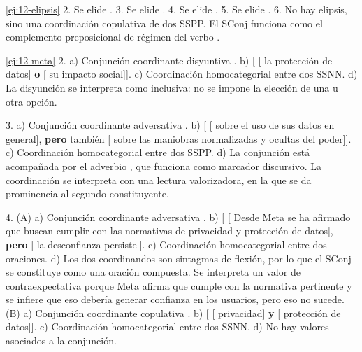 \begin{solucion}{\ref{ej:12-elipsis}}
2. Se elide . 3. Se elide . 4.
Se elide . 5. Se elide . 6. No hay elipsis, sino una coordinación copulativa de dos SSPP. El
SConj funciona como el complemento preposicional de régimen del verbo
.
\end{solucion}

\begin{solucion}{\ref{ej:12-meta}}
2. a) Conjunción coordinante disyuntiva . b) [
[ la protección de datos] \textbf{o} [ su
impacto social]]. c) Coordinación homocategorial entre dos SSNN. d) La
disyunción se interpreta como inclusiva: no se impone la elección de una u otra
opción.

3. a) Conjunción coordinante adversativa . b) [
[ sobre el uso de sus datos en general], \textbf{pero}
también [ sobre las maniobras normalizadas y ocultas del poder]].
c) Coordinación homocategorial entre dos SSPP. d) La conjunción está acompañada
por el adverbio , que funciona como marcador discursivo. La
coordinación se interpreta con una lectura valorizadora, en la que se da
prominencia al segundo constituyente.

4. (A) a) Conjunción coordinante adversativa . b) [
[ Desde Meta se ha afirmado que buscan cumplir con las normativas de
privacidad y protección de datos], \textbf{pero} [ la
desconfianza persiste]]. c) Coordinación homocategorial entre dos oraciones. d)
Los dos coordinandos son sintagmas de flexión, por lo que el SConj se constituye
como una oración compuesta. Se interpreta un valor de contraexpectativa porque
Meta afirma que cumple con la normativa pertinente y se infiere que eso debería
generar confianza en los usuarios, pero eso no sucede. (B) a) Conjunción
coordinante copulativa . b) [ [ privacidad]
\textbf{y} [ protección de datos]]. c) Coordinación
homocategorial entre dos SSNN. d) No hay valores asociados a la conjunción.


\end{solucion}
